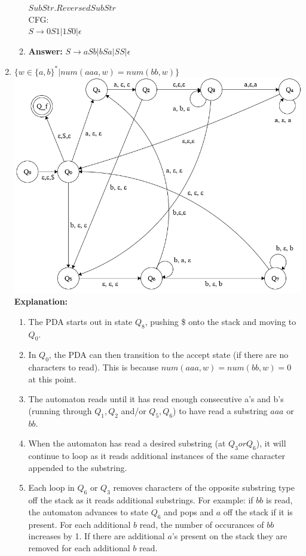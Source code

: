 \documentclass{article}
\begin{document}
\begin{enumerate}
\begin{enumerate}
				$SubStr.ReversedSubStr$\\
				CFG:\\
				$S \rightarrow 0S1 | 1S0 | \epsilon$
			\item 
				\textbf{Answer:} $S \rightarrow aSb | bSa | SS | \epsilon$\\
			\end{enumerate}
		\item $\{ w \in \{a,b\}^* | num(aaa,w) = num(bb,w)\}$\\
			\includegraphics[width=\textwidth]{p3.png}\\
			\textbf{Explanation:}\\
				\begin{enumerate}
					\item The PDA starts out in state $Q_8$, pushing \$ onto the stack and moving to $Q_0$.
					\item In $Q_0$, the PDA can then transition to the accept state (if there are no characters to read).  This is because $num(aaa,w) = num(bb,w) = 0$ at this point.
					\item The automaton reads until it has read enough consecutive a's and b's (running through $Q_1, Q_2$ and/or $Q_5, Q_6$) to have read a substring $aaa$ or $bb$.
					\item When the automaton has read a desired substring (at $Q_3 or Q_6$), it will continue to loop as it reads additional instances of the same character appended to the substring.
					\item Each loop in $Q_6$ or $Q_3$ removes characters of the opposite substring type off the stack as it reads additional substrings.  For example:  if $bb$ is read, the automaton advances to state $Q_6$ and pops and $a$ off the stack if it is present.  For each additional $b$ read, the number of occurances of $bb$ increases by 1.  If there are additional $a$'s present on the stack they are removed for each additional $b$ read.

\end{enumerate}
\end{enumerate}
\end{document}
